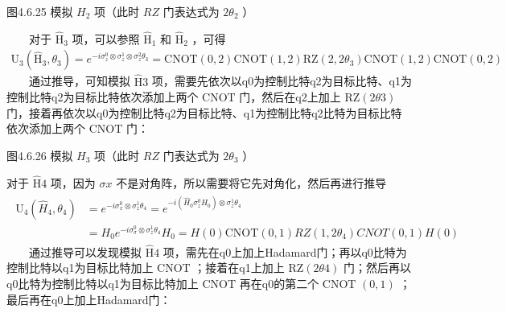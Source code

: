 \documentclass[a4paper,11pt,english]{sphinxmanual}
\begin{document}
\begin{center}图4.6.25 模拟 \(H_2\) 项（此时 \(RZ\) 门表达式为 \(2\theta_{2}\) ）
\end{center}
\sphinxAtStartPar
  对于 \(\mathrm{\hat{H}}_3\) 项，可以参照 \(\mathrm{\hat{H}}_1\) 和 \(\mathrm{\hat{H}}_2\) ，可得
\begin{equation*}
\begin{split}\mathrm{U}_{3}\left(\mathrm{\hat{H}}_{3}, \theta_{3}\right)=e^{-i \sigma_{z}^{0} \otimes \sigma_{z}^{1} \otimes \sigma_{z}^{2} \theta_{3}}=\text{CNOT}(0,2) \text{CNOT}(1,2) \mathrm{RZ}\left(2,2 \theta_{3}\right) \text{CNOT}(1,2) \text{CNOT}(0,2)\end{split}
\end{equation*}
\sphinxAtStartPar
  通过推导，可知模拟 \(\mathrm{\hat{H}}3\) 项，需要先依次以q0为控制比特q2为目标比特、q1为控制比特q2为目标比特依次添加上两个 \(\mathrm{CNOT}\) 门，然后在q2上加上  \(\mathrm{RZ}(2 \theta{3})\) 门，接着再依次以q0为控制比特q2为目标比特、q1为控制比特q2比特为目标比特依次添加上两个  \(\mathrm{CNOT}\) 门：


\begin{center}图4.6.26 模拟 \(H_3\) 项（此时 \(RZ\) 门表达式为 \(2\theta_{3}\) ）
\end{center}
\sphinxAtStartPar
对于  \(\mathrm{\hat{H}}4\) 项，因为  \(\sigma{x}\) 不是对角阵，所以需要将它先对角化，然后再进行推导
\begin{equation*}
\begin{split}\begin{aligned} \mathrm{U}_{4}\left(\hat{H}_{4}, \theta_{4}\right) &=e^{-{i} \sigma_{x}^{0} \otimes \sigma_{z}^{1} \theta_{4}}=e^{-i\left(\hat{H}_{0} \sigma_{z}^{0} H_{0}\right) \otimes \sigma_{z}^{1} \theta_{4}} \\ &=H_{0} e^{-i \sigma_{\sigma}^{0} \otimes \sigma_{z}^{1} \theta_{4}} H_{0}=H(0) \text{CNOT}(0,1) R Z\left(1,2 \theta_{4}\right) C N O T(0,1) H(0) \end{aligned}\end{split}
\end{equation*}
\sphinxAtStartPar
  通过推导可以发现模拟 \(\mathrm{\hat{H}}4\) 项，需先在q0上加上Hadamard门；再以q0比特为控制比特以q1为目标比特加上 \(\mathrm{CNOT}\) ；接着在q1上加上 \(\mathrm{RZ}(2 \theta{4})\) 门；然后再以q0比特为控制比特以q1为目标比特加上 \(\mathrm{CNOT}\) 再在q0的第二个 \(\mathrm{CNOT}\)   \({(0,1)}\) ；最后再在q0上加上Hadamard门：
\end{document}

